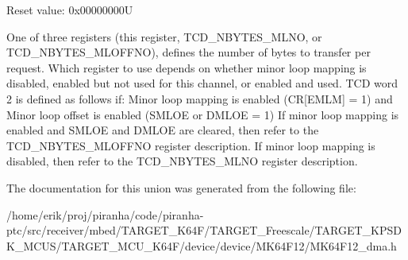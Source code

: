 Reset value\+: 0x00000000U

One of three registers (this register, T\+C\+D\+\_\+\+N\+B\+Y\+T\+E\+S\+\_\+\+M\+L\+NO, or T\+C\+D\+\_\+\+N\+B\+Y\+T\+E\+S\+\_\+\+M\+L\+O\+F\+F\+NO), defines the number of bytes to transfer per request. Which register to use depends on whether minor loop mapping is disabled, enabled but not used for this channel, or enabled and used. T\+CD word 2 is defined as follows if\+: Minor loop mapping is enabled (CR\mbox{[}E\+M\+LM\mbox{]} = 1) and Minor loop offset is enabled (S\+M\+L\+OE or D\+M\+L\+OE = 1) If minor loop mapping is enabled and S\+M\+L\+OE and D\+M\+L\+OE are cleared, then refer to the T\+C\+D\+\_\+\+N\+B\+Y\+T\+E\+S\+\_\+\+M\+L\+O\+F\+F\+NO register description. If minor loop mapping is disabled, then refer to the T\+C\+D\+\_\+\+N\+B\+Y\+T\+E\+S\+\_\+\+M\+L\+NO register description. 

The documentation for this union was generated from the following file\+:\begin{DoxyCompactItemize}
\item 
/home/erik/proj/piranha/code/piranha-\/ptc/src/receiver/mbed/\+T\+A\+R\+G\+E\+T\+\_\+\+K64\+F/\+T\+A\+R\+G\+E\+T\+\_\+\+Freescale/\+T\+A\+R\+G\+E\+T\+\_\+\+K\+P\+S\+D\+K\+\_\+\+M\+C\+U\+S/\+T\+A\+R\+G\+E\+T\+\_\+\+M\+C\+U\+\_\+\+K64\+F/device/device/\+M\+K64\+F12/M\+K64\+F12\+\_\+dma.\+h\end{DoxyCompactItemize}
